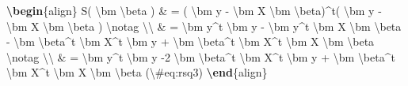 \documentclass[
]{book}
\newenvironment{Shaded}{\begin{snugshade}}{\end{snugshade}}
\newcommand{\ExtensionTok}[1]{#1}
\newcommand{\KeywordTok}[1]{\textcolor[rgb]{0.13,0.29,0.53}{\textbf{#1}}}
\newcommand{\NormalTok}[1]{#1}
\newcommand{\SpecialCharTok}[1]{\textcolor[rgb]{0.00,0.00,0.00}{#1}}
\newcommand{\SpecialStringTok}[1]{\textcolor[rgb]{0.31,0.60,0.02}{#1}}
\theoremstyle{definition}
\theoremstyle{definition}
\theoremstyle{definition}
\theoremstyle{definition}
\theoremstyle{remark}
\begin{document}
\begin{Shaded}
\begin{Highlighting}[]
\KeywordTok{\textbackslash{}begin}\NormalTok{\{}\ExtensionTok{align}\NormalTok{\}}\SpecialStringTok{ }
\SpecialStringTok{S( }\SpecialCharTok{\textbackslash{}bm}\SpecialStringTok{ }\SpecialCharTok{\textbackslash{}beta}\SpecialStringTok{ ) \& =  ( }\SpecialCharTok{\textbackslash{}bm}\SpecialStringTok{ y {-}  }\SpecialCharTok{\textbackslash{}bm}\SpecialStringTok{ X }\SpecialCharTok{\textbackslash{}bm}\SpecialStringTok{ }\SpecialCharTok{\textbackslash{}beta}\SpecialStringTok{)\^{}t( }\SpecialCharTok{\textbackslash{}bm}\SpecialStringTok{ y {-}  }\SpecialCharTok{\textbackslash{}bm}\SpecialStringTok{ X }\SpecialCharTok{\textbackslash{}bm}\SpecialStringTok{ }\SpecialCharTok{\textbackslash{}beta}\SpecialStringTok{ ) }\SpecialCharTok{\textbackslash{}notag}\SpecialStringTok{ }\SpecialCharTok{\textbackslash{}\textbackslash{}}
\SpecialStringTok{  \& = }\SpecialCharTok{\textbackslash{}bm}\SpecialStringTok{ y\^{}t }\SpecialCharTok{\textbackslash{}bm}\SpecialStringTok{ y {-} }\SpecialCharTok{\textbackslash{}bm}\SpecialStringTok{ y\^{}t }\SpecialCharTok{\textbackslash{}bm}\SpecialStringTok{ X }\SpecialCharTok{\textbackslash{}bm}\SpecialStringTok{ }\SpecialCharTok{\textbackslash{}beta}\SpecialStringTok{ {-} }\SpecialCharTok{\textbackslash{}bm}\SpecialStringTok{ }\SpecialCharTok{\textbackslash{}beta}\SpecialStringTok{\^{}t }\SpecialCharTok{\textbackslash{}bm}\SpecialStringTok{ X\^{}t }\SpecialCharTok{\textbackslash{}bm}\SpecialStringTok{ y}
\SpecialStringTok{    + }\SpecialCharTok{\textbackslash{}bm}\SpecialStringTok{ }\SpecialCharTok{\textbackslash{}beta}\SpecialStringTok{\^{}t }\SpecialCharTok{\textbackslash{}bm}\SpecialStringTok{ X\^{}t }\SpecialCharTok{\textbackslash{}bm}\SpecialStringTok{ X }\SpecialCharTok{\textbackslash{}bm}\SpecialStringTok{ }\SpecialCharTok{\textbackslash{}beta}\SpecialStringTok{ }\SpecialCharTok{\textbackslash{}notag}\SpecialStringTok{ }\SpecialCharTok{\textbackslash{}\textbackslash{}}
\SpecialStringTok{  \& = }\SpecialCharTok{\textbackslash{}bm}\SpecialStringTok{ y\^{}t }\SpecialCharTok{\textbackslash{}bm}\SpecialStringTok{ y {-}2  }\SpecialCharTok{\textbackslash{}bm}\SpecialStringTok{ }\SpecialCharTok{\textbackslash{}beta}\SpecialStringTok{\^{}t }\SpecialCharTok{\textbackslash{}bm}\SpecialStringTok{ X\^{}t }\SpecialCharTok{\textbackslash{}bm}\SpecialStringTok{ y}
\SpecialStringTok{    + }\SpecialCharTok{\textbackslash{}bm}\SpecialStringTok{ }\SpecialCharTok{\textbackslash{}beta}\SpecialStringTok{\^{}t }\SpecialCharTok{\textbackslash{}bm}\SpecialStringTok{ X\^{}t }\SpecialCharTok{\textbackslash{}bm}\SpecialStringTok{ X }\SpecialCharTok{\textbackslash{}bm}\SpecialStringTok{ }\SpecialCharTok{\textbackslash{}beta}\SpecialStringTok{ (}\SpecialCharTok{\textbackslash{}\#}\SpecialStringTok{eq:rsq3)   }
\KeywordTok{\textbackslash{}end}\NormalTok{\{}\ExtensionTok{align}\NormalTok{\}}
\end{Highlighting}
\end{Shaded}
\end{document}
